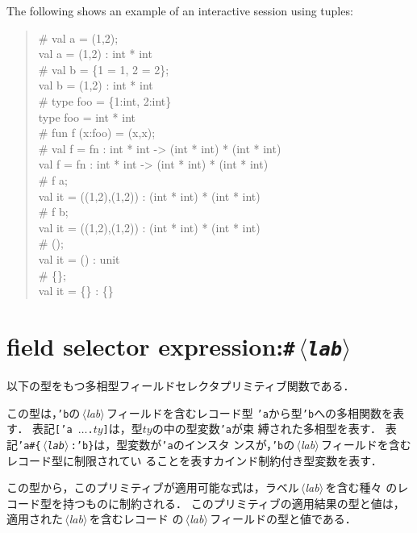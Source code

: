 \documentclass{jbook}
\newcommand{\txt}[2]{#2}
\newcommand{\code}[1]{\mbox{\large\tt #1}}
\newcommand{\nonterm}[1]{\mbox{$\,\langle$}{\it #1}\mbox{$\rangle\,$}}
\newcommand{\term}[1]{\mbox{{\tt #1}}}
\newenvironment{program}{\begin{quote}\begin{tt}}%
                        {\end{tt}\end{quote}}
\begin{document}
	The following shows an example of an interactive session using
tuples:
\fi%
\begin{program}
\# val a = (1,2);
\\
val a = (1,2) : int * int
\\
\# val b = \{1 = 1, 2 = 2\};
\\
val b = (1,2) : int * int
\\
\# type foo = \{1:int, 2:int\}
\\
type foo = int * int
\\
\# fun f (x:foo) = (x,x);
\\
\# val f = fn : int * int -> (int * int) * (int * int)
\\
val f = fn : int * int -> (int * int) * (int * int)
\\
\# f a;
\\
val it = ((1,2),(1,2)) : (int * int) * (int * int)
\\
\# f b;
\\
val it = ((1,2),(1,2)) : (int * int) * (int * int)
\\
\# ();
\\
val it = () : unit
\\
\# \{\};
\\
val it = \{\} : \{\}
\end{program}

\section{\txt{フィールドセレクタ式}{field selector expression}:\term{\#\nonterm{lab}}}

\ifjp%
	以下の型をもつ多相型フィールドセレクタプリミティブ関数である． 
\begin{program}
 ['a\#\{\nonterm{lab}:'b\}, 'b. 'a -> 'b]
\end{program}
	この型は，\code{'b}の\nonterm{lab}フィールドを含むレコード型
\code{'a}から型\code{'b}への多相関数を表す．
	表記\code{['a $\ldots$.$ty$]}は，型$ty$の中の型変数\code{'a}が束
縛された多相型を表す．
	表記\code{'a\#\{\nonterm{lab}:'b\}}は，型変数が\code{'a}のインスタ
ンスが，\code{'b}の\nonterm{lab}フィールドを含むレコード型に制限されてい
ることを表すカインド制約付き型変数を表す．

	この型から，このプリミティブが適用可能な式は，ラベル\nonterm{lab}を含む種々
のレコード型を持つものに制約される．
	このプリミティブの適用結果の型と値は，適用された\nonterm{lab}を含むレコード
の\nonterm{lab}フィールドの型と値である．
\end{document}
